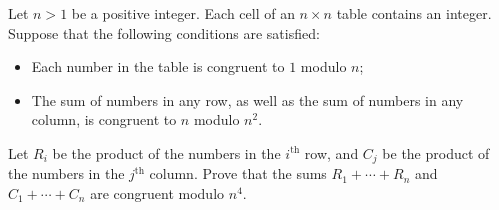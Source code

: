 Let $n>1$ be a positive integer. Each cell of an $n\times n$ table contains an integer. Suppose that the following conditions are satisfied:
\begin{itemize}
\item[$(i)$] Each number in the table is congruent to $1$ modulo $n$;
\item[$(ii)$] The sum of numbers in any row, as well as the sum of numbers in any column, is congruent to $n$ modulo $n^2$.
\end{itemize}
Let $R_i$ be the product of the numbers in the $i^{\text{th}}$ row, and $C_j$ be the product of the numbers in the $j^{\text{th}}$ column. Prove that the sums $R_1+\cdots+R_n$ and $C_1+\cdots+C_n$ are congruent modulo $n^4$.
